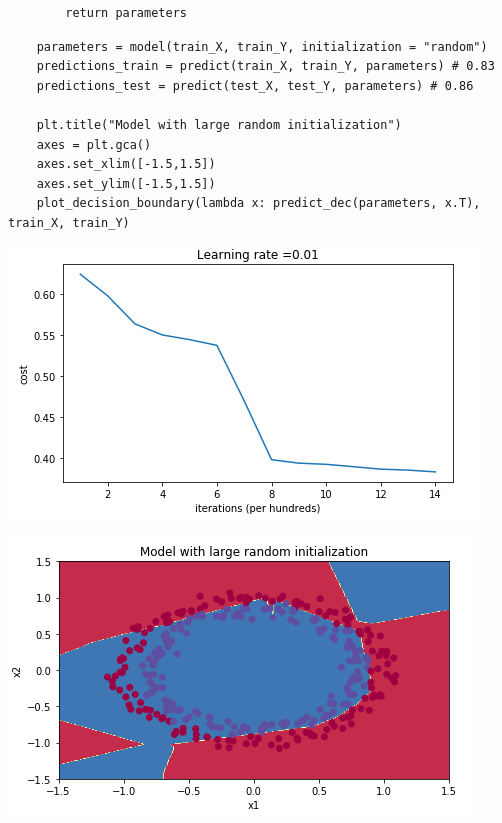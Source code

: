 \documentclass[11pt, a4paper]{article}
\begin{document}
\begin{spacing}{1.1}
\begin{lstlisting}
		return parameters \end{lstlisting} \newpage

	\begin{lstlisting}
	parameters = model(train_X, train_Y, initialization = "random")
	predictions_train = predict(train_X, train_Y, parameters) # 0.83
	predictions_test = predict(test_X, test_Y, parameters) # 0.86
	
	plt.title("Model with large random initialization")
	axes = plt.gca()
	axes.set_xlim([-1.5,1.5])
	axes.set_ylim([-1.5,1.5])
	plot_decision_boundary(lambda x: predict_dec(parameters, x.T), train_X, train_Y)\end{lstlisting} \vspace*{1mm}
	\begin{minipage}[c]{8.5cm}
	\begin{center}\includegraphics[scale=0.6]{rand_init_large} \end{center}
	\end{minipage}
	\begin{minipage}[c]{8.5cm}
	\begin{center}\includegraphics[scale=0.6]{dec_bound_rand} \\ \end{center} 

\end{minipage}
\end{spacing}
\end{document}
